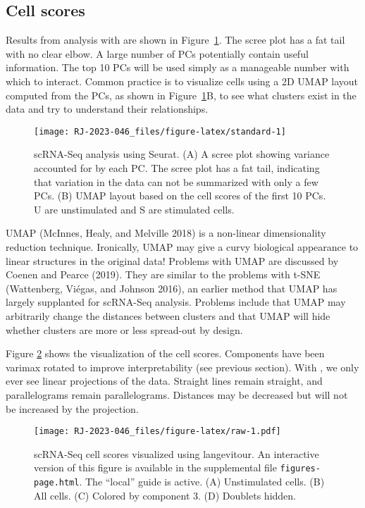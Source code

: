 \hypertarget{cell-scores}{%
\subsection{Cell scores}\label{cell-scores}}

Results from analysis with  are shown in Figure~\ref{fig:standard}. The scree plot has a fat tail with no clear elbow. A large number of PCs potentially contain useful information. The top 10 PCs will be used simply as a manageable number with which to interact. Common practice is to visualize cells using a 2D UMAP layout computed from the PCs, as shown in Figure~\ref{fig:standard}B, to see what clusters exist in the data and try to understand their relationships.

\begin{figure}
\texttt{[image: RJ-2023-046\_files/figure-latex/standard-1]} \caption{scRNA-Seq analysis using Seurat. (A) A scree plot showing variance accounted for by each PC. The scree plot has a fat tail, indicating that variation in the data can not be summarized with only a few PCs. (B) UMAP layout based on the cell scores of the first 10 PCs. U are unstimulated and S are stimulated cells.}\label{fig:standard}
\end{figure}

UMAP (McInnes, Healy, and Melville 2018) is a non-linear dimensionality reduction technique. Ironically, UMAP may give a curvy biological appearance to linear structures in the original data! Problems with UMAP are discussed by Coenen and Pearce (2019). They are similar to the problems with t-SNE (Wattenberg, Viégas, and Johnson 2016), an earlier method that UMAP has largely supplanted for scRNA-Seq analysis. Problems include that UMAP may arbitrarily change the distances between clusters and that UMAP will hide whether clusters are more or less spread-out by design.

Figure \ref{fig:raw} shows the  visualization of the cell scores. Components have been varimax rotated to improve interpretability (see previous section). With , we only ever see linear projections of the data. Straight lines remain straight, and parallelograms remain parallelograms. Distances may be decreased but will not be increased by the projection.

\begin{figure}
\centering
\texttt{[image: RJ-2023-046\_files/figure-latex/raw-1.pdf]}
\caption{\label{fig:raw}scRNA-Seq cell scores visualized using langevitour. An interactive version of this figure is available in the supplemental file \texttt{figures-page.html}. The ``local'' guide is active. (A) Unstimulated cells. (B) All cells. (C) Colored by component 3. (D) Doublets hidden.}
\end{figure}

